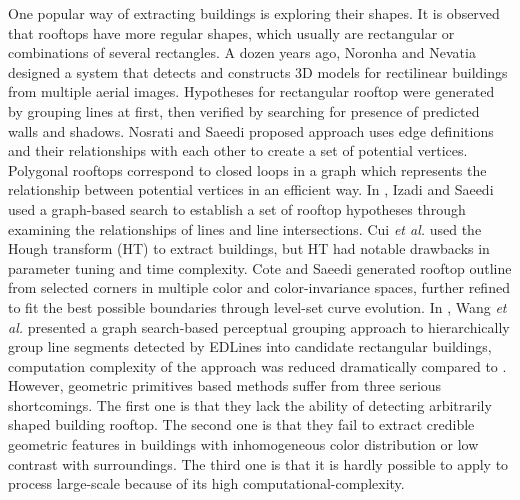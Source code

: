 	One popular way of extracting buildings is exploring their shapes. It is observed that rooftops have more regular shapes,
which usually are rectangular or combinations of several rectangles. A dozen years ago, Noronha and Nevatia \cite{noronha2001detection} designed a system that detects and constructs 3D models for rectilinear buildings from multiple aerial images. Hypotheses for rectangular rooftop were generated by grouping lines at first, then verified by searching for presence of predicted walls and shadows. Nosrati and Saeedi \cite{nosrati2009novel} proposed approach uses edge definitions and their relationships with each other to create a set of potential vertices. Polygonal rooftops correspond to closed loops in a graph which represents the relationship between potential vertices in an efficient way. In \cite{izadi2012three}, Izadi and Saeedi used a graph-based search to establish a set of rooftop hypotheses through examining the relationships of lines and line intersections. Cui \textit{et al.} \cite{cui2012complex} used the Hough transform (HT) to extract buildings, but HT had notable drawbacks in parameter tuning and time complexity. Cote and Saeedi \cite{cote2013automatic} generated rooftop outline from selected corners in  multiple color and color-invariance spaces, further refined to fit the best possible boundaries through level-set curve evolution. In \cite{wang2015efficient}, Wang \textit{et al.}  presented a graph search-based perceptual grouping approach to hierarchically group line segments detected by EDLines \cite{akinlar2011edlines} into candidate rectangular buildings, computation complexity of the approach was reduced dramatically compared to \cite{noronha2001detection} \cite{izadi2012three} \cite{cote2013automatic} \cite{mayunga2007semi}. However, geometric primitives based methods suffer from three serious shortcomings. The first one is that they lack the ability of detecting arbitrarily shaped building rooftop. The second one is that they fail to  extract credible geometric features in buildings with inhomogeneous color distribution or low contrast with surroundings. The third one is that it is hardly possible to apply to process large-scale because of its high computational-complexity.	 
	

